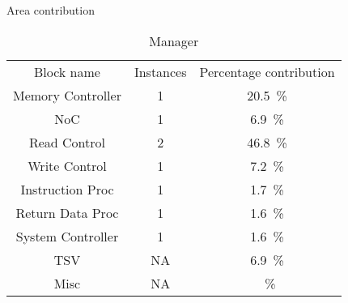 \begin{table}[h]
  \captionsetup{justification=centering, skip=3pt}
  \caption{Area contribution}
  \vspace{3pt}
  \label{tab:Area contribution}
  \centering
  \begin{subtable}{1\textwidth}
    \centering
    \begin{adjustbox}{width=0.50\textwidth}
      \begin{tabular}{|c|c|c|}
        \hline
       \multirow{2}{*}{Block name}    &  \multirow{2}{*}{Instances}        &  \multirow{2}{*}{Percentage contribution}     \\  %
                                      &                                    &                                               \\
        \hline  %
  Memory Controller      & 1&\SI[per-mode=symbol]{20.5}{\percent}  \\ 
        NoC              & 1&\SI[per-mode=symbol]{ 6.9}{\percent}  \\
        Read Control     & 2&\SI[per-mode=symbol]{46.8}{\percent}  \\
        Write Control    & 1&\SI[per-mode=symbol]{ 7.2}{\percent}  \\
      Instruction Proc   & 1&\SI[per-mode=symbol]{ 1.7}{\percent}  \\
      Return Data Proc   & 1&\SI[per-mode=symbol]{ 1.6}{\percent}  \\
      System Controller  & 1&\SI[per-mode=symbol]{ 1.6}{\percent}  \\
        TSV              &NA&\SI[per-mode=symbol]{ 6.9}{\percent}  \\
        Misc             &NA&\SI[per-mode=symbol]{}{\percent}  \\
        \hline
      \end{tabular}
    \end{adjustbox}
    \vspace{3pt}
    \captionsetup{justification=centering, skip=10pt}
    \caption{Manager}
    \label{tab:Manager Area Contribution}
  \end{subtable}
  \bigskip
  \begin{subtable}{1\textwidth}

\end{subtable}
\end{table}
